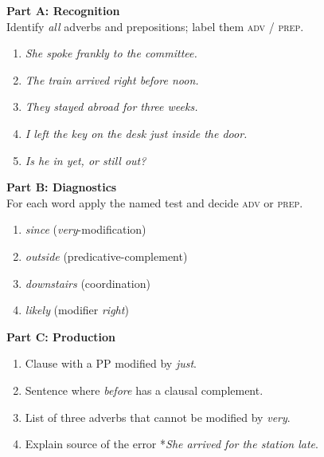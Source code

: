 \begin{tcolorbox}[title={Adverbs \& Prepositions},colback=white]
\textbf{Part A: Recognition}\\
\small Identify \emph{all} adverbs and prepositions; label them \textsc{adv} / \textsc{prep}.
\begin{enumerate}[nosep]
  \item \textit{She spoke frankly to the committee.}
  \item \textit{The train arrived right before noon.}
  \item \textit{They stayed abroad for three weeks.}
  \item \textit{I left the key on the desk just inside the door.}
  \item \textit{Is he in yet, or still out?}
\end{enumerate}

\vspace{0.5em}
\textbf{Part B: Diagnostics}\\
\small For each word apply the named test and decide \textsc{adv} or \textsc{prep}.
\begin{enumerate}[nosep]
  \item \textit{since} (\textit{very}-modification)
  \item \textit{outside} (predicative-complement)
  \item \textit{downstairs} (coordination)
  \item \textit{likely} (modifier \textit{right})
\end{enumerate}

\vspace{0.5em}
\textbf{Part C: Production}\\
\small
\begin{enumerate}[nosep]
  \item Clause with a PP modified by \textit{just}.
  \item Sentence where \textit{before} has a clausal complement.
  \item List of three adverbs that cannot be modified by \textit{very}.
  \item Explain source of the error *\textit{She arrived for the station late}.
\end{enumerate}
\end{tcolorbox}


